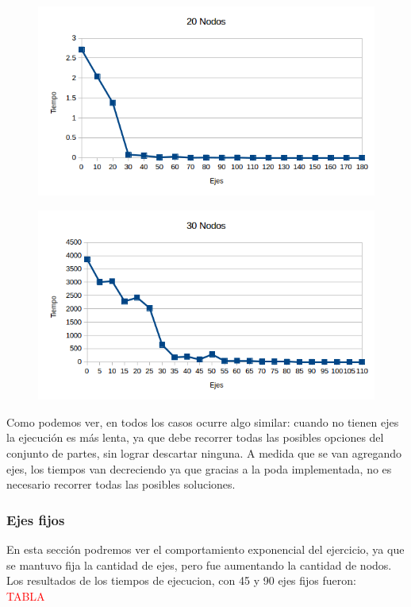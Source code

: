   \begin{figure}[h!]
   \begin{center}
 	\includegraphics[scale=0.7]{imagenes/exacto/20Nodos.png}
	\label{20Nodos}
   \end{center}
 \end{figure}
   \begin{figure}[h!]
   \begin{center}
 	\includegraphics[scale=0.7]{imagenes/exacto/30Nodos.png}
	\label{30Nodos}
   \end{center}
 \end{figure}
 
Como podemos ver, en todos los casos ocurre algo similar: cuando no tienen ejes la ejecuci\'on es m\'as lenta, ya que debe recorrer todas las posibles opciones del conjunto de partes, sin lograr descartar ninguna.
A medida que se van agregando ejes, los tiempos van decreciendo ya que gracias a la poda implementada, no es necesario recorrer todas las posibles soluciones.\\

\subsubsection{Ejes fijos}
En esta secci\'on podremos ver el comportamiento exponencial del ejercicio, ya que se mantuvo fija la cantidad de ejes, pero fue aumentando la cantidad de nodos.
Los resultados de los tiempos de ejecucion, con 45 y 90 ejes fijos fueron:\\
\textcolor{red}{TABLA}

